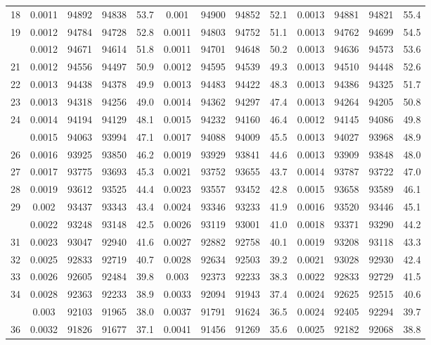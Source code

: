 \documentclass[
  14pt,
]{article}
\begin{document}
\begin{longtable}[t]{lcccccccccccc}
18 & 0.0011 & 94892 & 94838 & 53.7 & 0.001 & 94900 & 94852 & 52.1 & 0.0013 & 94881 & 94821 & 55.4\\
19 & 0.0012 & 94784 & 94728 & 52.8 & 0.0011 & 94803 & 94752 & 51.1 & 0.0013 & 94762 & 94699 & 54.5\\
\addlinespace
20 & 0.0012 & 94671 & 94614 & 51.8 & 0.0011 & 94701 & 94648 & 50.2 & 0.0013 & 94636 & 94573 & 53.6\\
21 & 0.0012 & 94556 & 94497 & 50.9 & 0.0012 & 94595 & 94539 & 49.3 & 0.0013 & 94510 & 94448 & 52.6\\
22 & 0.0013 & 94438 & 94378 & 49.9 & 0.0013 & 94483 & 94422 & 48.3 & 0.0013 & 94386 & 94325 & 51.7\\
23 & 0.0013 & 94318 & 94256 & 49.0 & 0.0014 & 94362 & 94297 & 47.4 & 0.0013 & 94264 & 94205 & 50.8\\
24 & 0.0014 & 94194 & 94129 & 48.1 & 0.0015 & 94232 & 94160 & 46.4 & 0.0012 & 94145 & 94086 & 49.8\\
\addlinespace
25 & 0.0015 & 94063 & 93994 & 47.1 & 0.0017 & 94088 & 94009 & 45.5 & 0.0013 & 94027 & 93968 & 48.9\\
26 & 0.0016 & 93925 & 93850 & 46.2 & 0.0019 & 93929 & 93841 & 44.6 & 0.0013 & 93909 & 93848 & 48.0\\
27 & 0.0017 & 93775 & 93693 & 45.3 & 0.0021 & 93752 & 93655 & 43.7 & 0.0014 & 93787 & 93722 & 47.0\\
28 & 0.0019 & 93612 & 93525 & 44.4 & 0.0023 & 93557 & 93452 & 42.8 & 0.0015 & 93658 & 93589 & 46.1\\
29 & 0.002 & 93437 & 93343 & 43.4 & 0.0024 & 93346 & 93233 & 41.9 & 0.0016 & 93520 & 93446 & 45.1\\
\addlinespace
30 & 0.0022 & 93248 & 93148 & 42.5 & 0.0026 & 93119 & 93001 & 41.0 & 0.0018 & 93371 & 93290 & 44.2\\
31 & 0.0023 & 93047 & 92940 & 41.6 & 0.0027 & 92882 & 92758 & 40.1 & 0.0019 & 93208 & 93118 & 43.3\\
32 & 0.0025 & 92833 & 92719 & 40.7 & 0.0028 & 92634 & 92503 & 39.2 & 0.0021 & 93028 & 92930 & 42.4\\
33 & 0.0026 & 92605 & 92484 & 39.8 & 0.003 & 92373 & 92233 & 38.3 & 0.0022 & 92833 & 92729 & 41.5\\
34 & 0.0028 & 92363 & 92233 & 38.9 & 0.0033 & 92094 & 91943 & 37.4 & 0.0024 & 92625 & 92515 & 40.6\\
\addlinespace
35 & 0.003 & 92103 & 91965 & 38.0 & 0.0037 & 91791 & 91624 & 36.5 & 0.0024 & 92405 & 92294 & 39.7\\
36 & 0.0032 & 91826 & 91677 & 37.1 & 0.0041 & 91456 & 91269 & 35.6 & 0.0025 & 92182 & 92068 & 38.8\\

\end{longtable}
\end{document}

